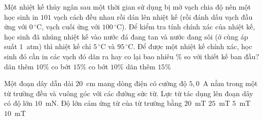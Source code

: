	\begin{ex}%
		Một nhiệt kế thủy ngân sau một thời gian sử dụng bị mờ vạch chia độ nên một học sinh in $101$ vạch cách đều nhau rồi dán lên nhiệt kế (rồi đánh dấu vạch đầu ứng với $0\,^\circ\text{C}$, vạch cuối ứng với $100\,^\circ\text{C}$). Để kiểm tra tính chính xác của nhiệt kế, học sinh đã nhúng nhiệt kế vào nước đá đang tan và nước đang sôi (ở cùng áp suất $1$~atm) thì nhiệt kế chỉ $5\,^\circ\text{C}$ và $95\,^\circ\text{C}$. Để được một nhiệt kế chính xác, học sinh đó cần in các vạch đó dãn ra hay co lại bao nhiêu \% so với thiết kế ban đầu?
		\choice
		{dãn thêm $10\%$}
		{co bớt $15\%$}
		{\True co bớt $10\%$}
		{dãn thêm $15\%$}
	\end{ex}

	\begin{ex}%
		Một đoạn dây dẫn dài $20$~cm mang dòng điện có cường độ $5{,}0$~A nằm trong một từ trường đều và vuông góc với các đường sức từ. Lực từ tác dụng lên đoạn dây có độ lớn $10$~mN. Độ lớn cảm ứng từ của từ trường bằng
		\choice
		{$20$~mT}
		{$25$~mT}
		{$5$~mT}
		{\True $10$~mT}
	\end{ex}

